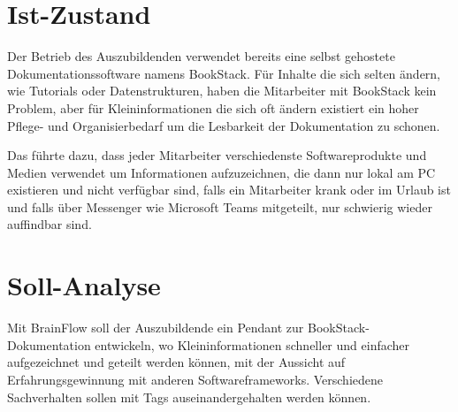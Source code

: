\section{Ist-Zustand}
        Der Betrieb des Auszubildenden verwendet bereits eine selbst gehostete Dokumentationssoftware namens BookStack.
        Für Inhalte die sich selten ändern, wie Tutorials oder Datenstrukturen, haben die Mitarbeiter mit BookStack kein Problem,
        aber für Kleininformationen die sich oft ändern existiert ein hoher Pflege- und Organisierbedarf um die Lesbarkeit der Dokumentation zu schonen.

        \bigskip\noindent
        Das führte dazu, dass jeder Mitarbeiter verschiedenste Softwareprodukte und Medien verwendet um Informationen aufzuzeichnen, die dann nur lokal
        am PC existieren und nicht verfügbar sind, falls ein Mitarbeiter krank oder im Urlaub ist und falls über Messenger wie Microsoft Teams mitgeteilt, nur 
        schwierig wieder auffindbar sind.

\section{Soll-Analyse}
        Mit BrainFlow soll der Auszubildende ein Pendant zur BookStack-Dokumentation entwickeln, wo Kleininformationen schneller und einfacher aufgezeichnet und
        geteilt werden können, mit der Aussicht auf Erfahrungsgewinnung mit anderen Softwareframeworks. Verschiedene Sachverhalten sollen mit Tags auseinandergehalten werden können.